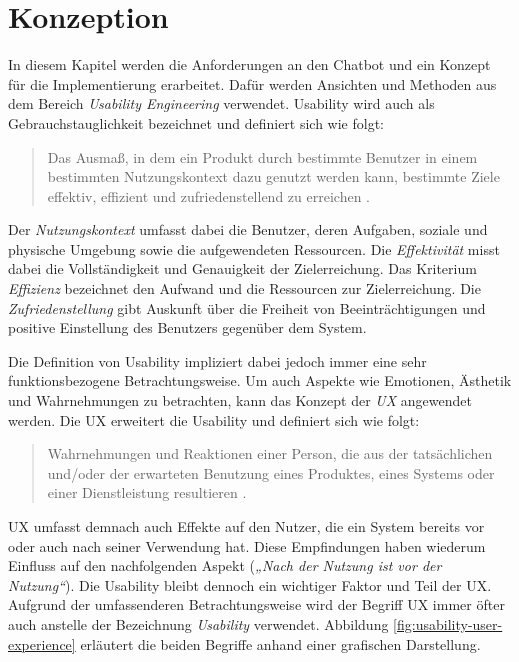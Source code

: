 \chapter{Konzeption}
\label{cha:konzeption}

In diesem Kapitel werden die Anforderungen an den Chatbot und ein Konzept für die Implementierung erarbeitet.  Dafür werden Ansichten und Methoden aus dem Bereich \textit{Usability Engineering} verwendet. Usability wird auch als Gebrauchstauglichkeit bezeichnet und definiert sich wie folgt: 

\begin{quote}
    Das Ausmaß, in dem ein Produkt durch bestimmte Benutzer in einem bestimmten Nutzungskontext dazu genutzt werden kann, bestimmte Ziele effektiv, effizient und zufriedenstellend zu erreichen \cite[S. 11]{richter_usability_2016}.
\end{quote}

Der \textit{Nutzungskontext} umfasst dabei die Benutzer, deren Aufgaben, soziale und physische Umgebung sowie die aufgewendeten Ressourcen. Die \textit{Effektivität} misst dabei die Vollständigkeit und Genauigkeit der Zielerreichung. Das Kriterium \textit{Effizienz} bezeichnet den Aufwand und die Ressourcen zur Zielerreichung. Die \textit{Zufriedenstellung} gibt Auskunft über die Freiheit von Beeinträchtigungen und positive Einstellung des Benutzers gegenüber dem System. 

Die Definition von Usability impliziert dabei jedoch immer eine sehr funktionsbezogene Betrachtungsweise. Um auch Aspekte wie Emotionen, Ästhetik und Wahrnehmungen zu betrachten, kann das Konzept der \textit{\ac{UX}} angewendet werden. Die \acl{UX} erweitert die Usability und definiert sich wie folgt:

\begin{quote}
   Wahrnehmungen und Reaktionen einer Person, die aus der tatsächlichen und/oder der erwarteten Benutzung eines Produktes, eines Systems oder einer Dienstleistung resultieren \cite[S. 14]{gast_user_2018}.
\end{quote}

\ac{UX} umfasst demnach auch Effekte auf den Nutzer, die ein System bereits vor oder auch nach seiner Verwendung hat. Diese Empfindungen haben wiederum Einfluss auf den nachfolgenden Aspekt (\textit{„Nach der Nutzung ist vor der Nutzung“}).
Die Usability bleibt dennoch ein wichtiger Faktor und Teil der \acl{UX}. Aufgrund der umfassenderen Betrachtungsweise wird der Begriff \ac{UX} immer öfter auch anstelle der Bezeichnung \textit{Usability} verwendet. Abbildung \ref{fig:usability-user-experience} erläutert die beiden Begriffe anhand einer grafischen Darstellung.
\newline

